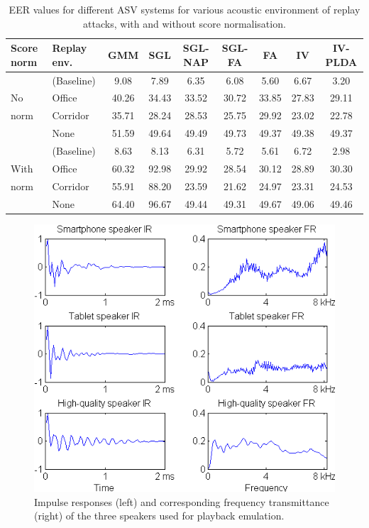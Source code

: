 \begin{table}
\begin{center}
    \begin{tabular}{ l l || c c c c c c c}
    \hline
Score norm & Replay env. &  GMM & SGL & SGL-NAP  & SGL-FA & FA & IV & IV-PLDA \\ 

 \hline \hline
& (Baseline) & 9.08 & 7.89 & 6.35 & 6.08 & 5.60 & 6.67 & 3.20\\
No & Office  & 40.26 & 34.43 & 33.52 & 30.72 & 33.85 & 27.83 & 29.11\\
norm & Corridor & 35.71 & 28.24 & 28.53 & 25.75 & 29.92 & 23.02 & 22.78\\
& None & 51.59 & 49.64 & 49.49 & 49.73 & 49.37 & 49.38 & 49.37\\
\hline
& (Baseline) & 8.63 & 8.13 & 6.31 & 5.72 & 5.61 & 6.72 & 2.98\\
With & Office  & 60.32 & 92.98 & 29.92 & 28.54 & 30.12 & 28.89 & 30.30\\
norm & Corridor & 55.91 & 88.20 & 23.59 & 21.62 & 24.97 & 23.31 & 24.53\\
& None & 64.40 & 96.67 & 49.44 & 49.31 & 49.67 & 49.06 & 49.46\\
\hline
    \end{tabular}
    \caption{EER values for different ASV systems for various acoustic environment of replay attacks, with and without score normalisation. }
		\label{tab::results_EER}
   \end{center}
\end{table}


\begin{figure}
	\centering
	\includegraphics[width=1\linewidth]{Figs/IRs.png}
	\caption{Impulse responses (left) and corresponding frequency transmittance (right) of the three speakers used for playback emulation.}
	\label{fig::IRs}
\end{figure}

